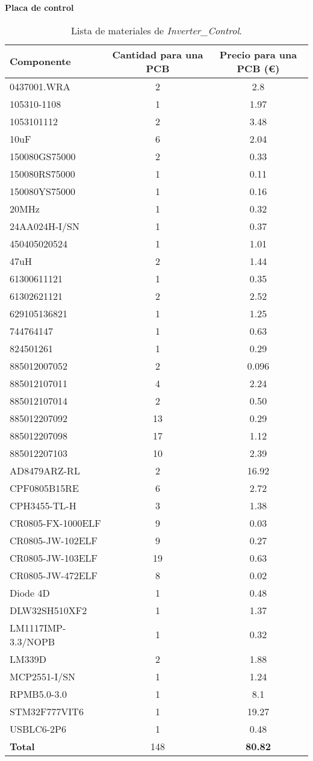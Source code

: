 \textbf{Placa de control}
\begin{table}[H]
	\centering
	\begin{tabular}{|l|c|c|}
		\hline
		\textbf{Componente} & \textbf{Cantidad para una PCB} & \textbf{Precio para una PCB (\euro{})} \\
		\hline
		0437001.WRA & 2 & 2.8 \\
		105310-1108 & 1 & 1.97 \\
		1053101112 & 2 & 3.48 \\
		10uF & 6 & 2.04 \\
		150080GS75000 & 2 & 0.33 \\
		150080RS75000 & 1 & 0.11 \\
		150080YS75000 & 1 & 0.16 \\
		20MHz & 1 & 0.32 \\
		24AA024H-I/SN & 1 & 0.37 \\
		450405020524 & 1 & 1.01 \\
		47uH & 2 & 1.44 \\
		61300611121 & 1 & 0.35 \\
		61302621121 & 2 & 2.52 \\
		629105136821 & 1 & 1.25 \\
		744764147 & 1 & 0.63 \\
		824501261 & 1 & 0.29 \\
		885012007052 & 2 & 0.096 \\
		885012107011 & 4 & 2.24 \\
		885012107014 & 2 & 0.50 \\
		885012207092 & 13 & 0.29 \\
		885012207098 & 17 & 1.12 \\
		885012207103 & 10 & 2.39 \\
		AD8479ARZ-RL & 2 & 16.92 \\
		CPF0805B15RE & 6 & 2.72 \\
		CPH3455-TL-H & 3 & 1.38 \\
		CR0805-FX-1000ELF & 9 & 0.03 \\
		CR0805-JW-102ELF & 9 & 0.27 \\
		CR0805-JW-103ELF & 19 & 0.63 \\
		CR0805-JW-472ELF & 8 & 0.02 \\
		Diode 4D & 1 & 0.48 \\
		DLW32SH510XF2 & 1 & 1.37 \\
		LM1117IMP-3.3/NOPB & 1 & 0.32 \\
		LM339D & 2 & 1.88 \\
		MCP2551-I/SN & 1 & 1.24 \\
		RPMB5.0-3.0 & 1 & 8.1 \\
		STM32F777VIT6 & 1 & 19.27 \\
		USBLC6-2P6 & 1 & 0.48 \\
		\hline
		\textbf{Total} & 148 & \textbf{80.82} \\
		\hline
	\end{tabular}
	\caption{Lista de materiales de \textit{Inverter\_Control}.}
\end{table}


